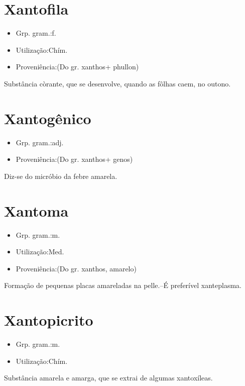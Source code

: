 \section{Xantofila}
\begin{itemize}
\item {Grp. gram.:f.}
\end{itemize}
\begin{itemize}
\item {Utilização:Chím.}
\end{itemize}
\begin{itemize}
\item {Proveniência:(Do gr. \textunderscore xanthos\textunderscore  + \textunderscore phullon\textunderscore )}
\end{itemize}
Substância còrante, que se desenvolve, quando as fôlhas caem, no outono.
\section{Xantogênico}
\begin{itemize}
\item {Grp. gram.:adj.}
\end{itemize}
\begin{itemize}
\item {Proveniência:(Do gr. \textunderscore xanthos\textunderscore  + \textunderscore genos\textunderscore )}
\end{itemize}
Diz-se do micróbio da febre amarela.
\section{Xantoma}
\begin{itemize}
\item {Grp. gram.:m.}
\end{itemize}
\begin{itemize}
\item {Utilização:Med.}
\end{itemize}
\begin{itemize}
\item {Proveniência:(Do gr. \textunderscore xanthos\textunderscore , amarelo)}
\end{itemize}
Formação de pequenas placas amareladas na pelle.--É preferível \textunderscore xanteplasma\textunderscore .
\section{Xantopicrito}
\begin{itemize}
\item {Grp. gram.:m.}
\end{itemize}
\begin{itemize}
\item {Utilização:Chím.}
\end{itemize}
Substância amarela e amarga, que se extrai de algumas xantoxíleas.
